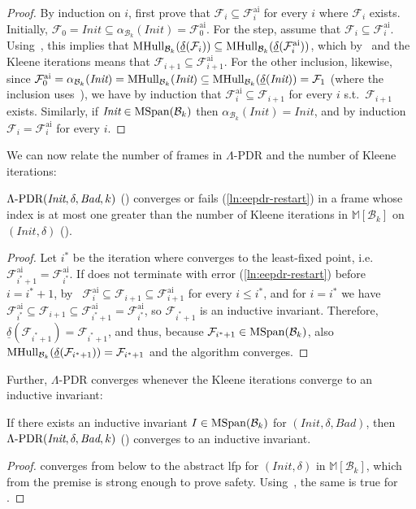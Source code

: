 \documentclass[acmsmall,screen]{acmart}
\newcommand{\Init}{{\textit{Init}}}
\newcommand{\Bad}{\textit{Bad}}
\newcommand{\tr}{\delta}
\newcommand{\Frame}{\mathcal{F}}
\newcommand{\Frameai}{\mathcal{F}^{\text{ai}}}
\newcommand{\reflextr}[1]{\underline{#1}}
\newcommand{\postimage}[2]{{\reflextr{#1}}({#2})}
\newcommand{\bkwrch}[1]{\mathcal{B}_{#1}}
\newcommand{\mspan}[1]{{\rm MSpan}({#1})}
\newcommand{\bkwspan}[1]{\mspan{\bkwrch{#1}}}
\newcommand{\mhull}[2]{{\rm MHull}_{#2}({#1})}
\newcommand{\malpha}[1]{\alpha_{#1}}
\newcommand{\madom}[1]{\mathbb{M}[{#1}]}
\newcommand{\eepdr}{\Lambda\mbox{\rm-PDR}}
\begin{document}
\begin{proof}
By induction on $i$, first prove that $\Frame_i \subseteq \Frameai_i$ for every $i$ where $\Frame_i$ exists.
Initially, $\Frame_0 = \Init \subseteq \malpha{\bkwrch{k}}(\Init) =\Frameai_0$.
For the step, assume that $\Frame_i \subseteq \Frameai_i$.  %
Using~, this implies that $\mhull{\postimage{\tr}{\Frame_i}}{\bkwrch{k}} \subseteq \mhull{\postimage{\tr}{\Frameai_i}}{\bkwrch{k}}$, which by~ and the Kleene iterations means that $\Frame_{i+1} \subseteq \Frameai_{i+1}$. %
%
For the other inclusion, likewise, since $\Frameai_0 = \malpha{\bkwrch{k}}(\Init) = \mhull{\Init}{\bkwrch{k}} \subseteq \mhull{\postimage{\tr}{\Init}}{\bkwrch{k}} = \Frame_1$ \iflong(where the inclusion uses~)\fi, we have by induction that $\Frameai_i \subseteq \Frame_{i+1}$ for every $i$ s.t.\ $\Frame_{i+1}$ exists.
%
Similarly, if $\Init \in \bkwspan{k}$ then $\malpha{\bkwrch{k}}(\Init) = \Init$, and by induction $\Frame_{i}=\Frameai_i$ for every $i$.
\end{proof}
We can now relate the number of frames in $\Lambda$-PDR and the number of Kleene iterations:
\begin{corollary}
\label{lem:eepdr-ai-iterations}
$\eepdr(\Init,\tr,\Bad,k)$ () converges or fails (\cref{ln:eepdr-restart}) in a frame whose index is at most one greater than the number of Kleene iterations in $\madom{\bkwrch{k}}$ on $(\Init,\tr)$ ().
\end{corollary}
\begin{proof}
%
Let $i^*$ be the iteration where  converges to the least-fixed point, i.e. $\Frameai_{i^*+1}=\Frameai_{i^*}$.
%
%
%
%
%
%
%
If  does not terminate with error (\cref{ln:eepdr-restart}) before $i = i^*+1$, by~ $\Frameai_i \subseteq \Frame_{i+1} \subseteq \Frameai_{i+1}$ for every $i \leq i^*$, and for $i=i^*$ we have $\Frameai_{i^*} \subseteq \Frame_{i+1} \subseteq \Frameai_{i^*+1}=\Frameai_{i^*}$, so $\Frame_{i^*+1}$ is an inductive invariant.
%
Therefore, $\postimage{\tr}{\Frame_{i^*+1}} = \Frame_{i^*+1}$, and thus, because $\Frame_{i^*+1} \in \bkwspan{k}$, also $\mhull{\postimage{\tr}{\Frame_{i^*+1}}}{\bkwrch{k}} = \Frame_{i^*+1}$ and the algorithm converges.
\end{proof}
Further, $\Lambda$-PDR converges whenever the Kleene iterations converge to an inductive invariant:
\begin{corollary}
\label{lem:eepdr-lfp}
If there exists an inductive invariant $I \in \bkwspan{k}$ for $(\Init,\tr,\Bad)$, then $\eepdr(\Init,\tr,\Bad,k)$ () converges to an inductive invariant.
\end{corollary}
\begin{proof}
 converges from below to the abstract lfp for $(\Init,\tr)$ in $\madom{\bkwrch{k}}$, which from the premise is strong enough to prove safety. Using~, %
the same is true for .
\end{proof}
\end{document}
